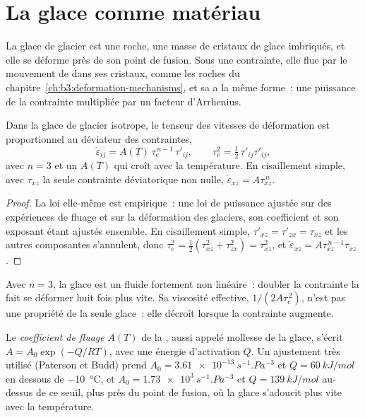 \section{La glace comme matériau}\label{sec:b3:glaciology:material}

La glace de glacier est une roche, une masse de cristaux de glace imbriqués, et elle
se déforme près de son point de fusion. Sous une contrainte, elle flue par le
mouvement de  dans ses cristaux, comme les roches du
chapitre~\ref{ch:b3:deformation-mechanisms}, et sa  a la même
forme~: une puissance de la contrainte multipliée par un facteur d'Arrhenius.

\begin{theorem}\label{thm:b3:glaciology:glen}
Dans la glace de glacier isotrope, le tenseur des vitesses de déformation est proportionnel
au déviateur des contraintes,
\[
\dot\varepsilon_{ij} = A(T)\,\tau_e^{\,n-1}\,\tau'_{ij}, \qquad
\tau_e^2 = \tfrac12\,\tau'_{ij}\tau'_{ij},
\]
avec $n = 3$ et un  $A(T)$ qui croît avec la température. En
cisaillement simple, avec $\tau_{xz}$ la seule contrainte déviatorique non nulle,
$\dot\varepsilon_{xz} = A\tau_{xz}^{\,n}$.
\end{theorem}

\begin{proof}
La loi elle-même est empirique~: une loi de puissance ajustée sur des expériences de fluage
et sur la déformation des glaciers, son coefficient et son exposant étant ajustés
ensemble. En cisaillement simple, $\tau'_{xz} = \tau'_{zx} = \tau_{xz}$ et les
autres composantes s'annulent, donc $\tau_e^2 = \tfrac12(\tau_{xz}^2 +
\tau_{zx}^2) = \tau_{xz}^2$, et $\dot\varepsilon_{xz} = A\tau_{xz}^{\,n-1}
\tau_{xz}$.
\end{proof}

Avec $n = 3$, la glace est un fluide fortement non linéaire~: doubler la contrainte la fait
se déformer huit fois plus vite. Sa viscosité effective, $1/(2A\tau_e^{\,2})$,
n'est pas une propriété de la seule glace~: elle décroît lorsque la contrainte augmente.

\begin{definition}\label{def:b3:glaciology:glen}
Le \emph{coefficient de fluage} $A(T)$ de la , aussi
appelé mollesse de la glace, s'écrit $A = A_0\exp(-Q/RT)$, avec une
énergie d'activation $Q$. Un ajustement très utilisé (Paterson et Budd) prend $A_0 =
\qty{3.61e-13}{s^{-1}.Pa^{-3}}$ et $Q = \qty{60}{kJ/mol}$ en dessous de
\qty{-10}{\celsius}, et $A_0 = \qty{1.73e3}{s^{-1}.Pa^{-3}}$ et $Q =
\qty{139}{kJ/mol}$ au-dessus de ce seuil, plus près du point de fusion, où la glace
s'adoucit plus vite avec la température.
\end{definition}

